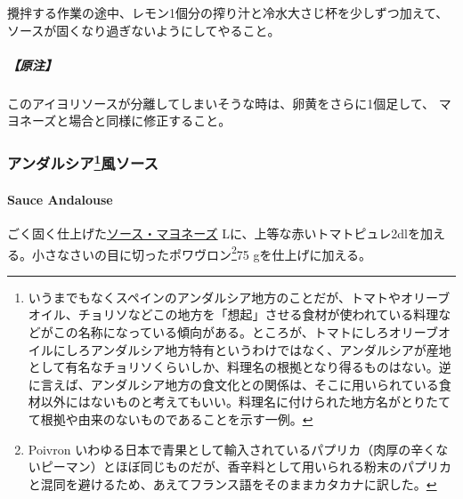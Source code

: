 \begin{recette}
攪拌する作業の途中、レモン1個分の搾り汁と冷水大さじ\undemi{}杯を少しずつ加えて、ソースが固くなり過ぎないようにしてやること。

\hypertarget{ux539fux6ce8}{%
\subparagraph{【原注】}\label{ux539fux6ce8}}

このアイヨリソースが分離してしまいそうな時は、卵黄をさらに1個足して、
マヨネーズと場合と同様に修正すること。

\maeaki

\hypertarget{ux30a2ux30f3ux30c0ux30ebux30b7ux30a25ux98a8ux30bdux30fcux30b9}{%
\subsubsection[アンダルシア風ソース]{\texorpdfstring{アンダルシア\footnote{いうまでもなくスペインのアンダルシア地方のことだが、トマトやオリーブオイル、チョリソなどこの地方を「想起」させる食材が使われている料理などがこの名称になっている傾向がある。ところが、トマトにしろオリーブオイルにしろアンダルシア地方特有というわけではなく、アンダルシアが産地として有名なチョリソくらいしか、料理名の根拠となり得るものはない。逆に言えば、アンダルシア地方の食文化との関係は、そこに用いられている食材以外にはないものと考えてもいい。料理名に付けられた地方名がとりたてて根拠や由来のないものであることを示す一例。}風ソース}{アンダルシア風ソース}}\label{ux30a2ux30f3ux30c0ux30ebux30b7ux30a25ux98a8ux30bdux30fcux30b9}}

\hypertarget{sauce-andalouse}{%
\paragraph{Sauce Andalouse}\label{sauce-andalouse}}


ごく固く仕上げた\protect\hyperlink{mayonnaise}{ソース・マヨネーズ}\troisquarts{}
Lに、上等な赤いトマトピュレ2\undemi{}dlを加える。小さなさいの目に切ったポワヴロン\footnote{Poivron
  いわゆる日本で青果として輸入されているパプリカ（肉厚の辛くないピーマン）とほぼ同じものだが、香辛料として用いられる粉末のパプリカと混同を避けるため、あえてフランス語をそのままカタカナに訳した。}75
gを仕上げに加える。

\maeaki


\end{recette}
